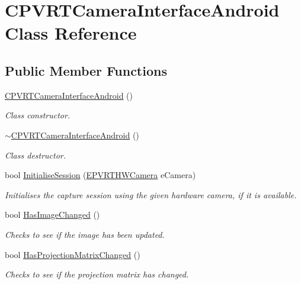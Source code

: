 \hypertarget{class_c_p_v_r_t_camera_interface_android}{\section{C\+P\+V\+R\+T\+Camera\+Interface\+Android Class Reference}
\label{class_c_p_v_r_t_camera_interface_android}
}
\subsection*{Public Member Functions}
\begin{DoxyCompactItemize}
\item 
\hyperlink{class_c_p_v_r_t_camera_interface_android_a21d6c5528ea7d889f6eea8c489949175}{C\+P\+V\+R\+T\+Camera\+Interface\+Android} ()
\begin{DoxyCompactList}\small\item\em Class constructor. \end{DoxyCompactList}\item 
\hyperlink{class_c_p_v_r_t_camera_interface_android_a9cf9780f14c5e4a1038cbf6e660394b9}{$\sim$\+C\+P\+V\+R\+T\+Camera\+Interface\+Android} ()
\begin{DoxyCompactList}\small\item\em Class destructor. \end{DoxyCompactList}\item 
bool \hyperlink{class_c_p_v_r_t_camera_interface_android_a6f057d19372232e4a65e4fa302c579f0}{Initialise\+Session} (\hyperlink{group___a_p_i___c_a_m_e_r_a_i_n_t_e_r_f_a_c_e_ga973910e3cdfc4daa01afa5adc2fccfdb}{E\+P\+V\+R\+T\+H\+W\+Camera} e\+Camera)
\begin{DoxyCompactList}\small\item\em Initialises the capture session using the given hardware camera, if it is available. \end{DoxyCompactList}\item 
bool \hyperlink{class_c_p_v_r_t_camera_interface_android_a951e05951bbf7e0bfb958369de9dba44}{Has\+Image\+Changed} ()
\begin{DoxyCompactList}\small\item\em Checks to see if the image has been updated. \end{DoxyCompactList}\item 
bool \hyperlink{class_c_p_v_r_t_camera_interface_android_a5a15a98ab9d234871163a662ee10dc03}{Has\+Projection\+Matrix\+Changed} ()
\begin{DoxyCompactList}\small\item\em Checks to see if the projection matrix has changed. \end{DoxyCompactList}\item 

\end{DoxyCompactItemize}
